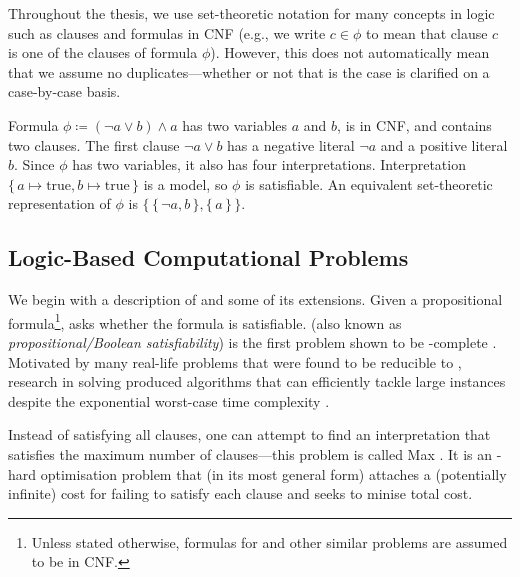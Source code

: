 Throughout the thesis, we use set-theoretic notation for many concepts in logic such as clauses and formulas in CNF (e.g., we write $c \in \phi$ to mean that clause $c$ is one of the clauses of formula $\phi$). However, this does not automatically mean that we assume no duplicates---whether or not that is the case is clarified on a case-by-case basis.

\begin{example} \label{example:logic}
  Formula $\phi \coloneqq (\neg a \lor b) \land a$ has two variables $a$ and $b$, is in CNF, and contains two clauses. The first clause $\neg a \lor b$ has a negative literal $\neg a$ and a positive literal $b$. Since $\phi$ has two variables, it also has four interpretations. Interpretation $\{\, a \mapsto \text{true}, b \mapsto \text{true} \,\}$ is a model, so $\phi$ is satisfiable. An equivalent set-theoretic representation of $\phi$ is $\{\, \{\, \neg a, b \,\}, \{\, a \,\} \,\}$.
\end{example}

\subsection{Logic-Based Computational Problems} \label{sec:logicproblems}

We begin with a description of \SAT{} and some of its extensions. Given a propositional formula\footnote{Unless stated otherwise, formulas for \SAT{} and other similar problems are assumed to be in CNF.}, \SAT{} asks whether the formula is satisfiable. \SAT{} (also known as \emph{propositional/Boolean satisfiability}) is the first problem shown to be \NP-complete \citep{DBLP:conf/stoc/Cook71,levin1973universal}. Motivated by many real-life problems that were found to be reducible to \SAT{}, research in \SAT{} solving produced algorithms that can efficiently tackle large instances despite the exponential worst-case time complexity \citep{DBLP:series/faia/2009-185}.

Instead of satisfying all clauses, one can attempt to find an interpretation that satisfies the maximum number of clauses---this problem is called Max\SAT{} \citep{bacchus2021maximum,DBLP:series/faia/LiM09}. It is an \NP-hard optimisation problem that (in its most general form) attaches a (potentially infinite) cost for failing to satisfy each clause and seeks to minise total cost.

